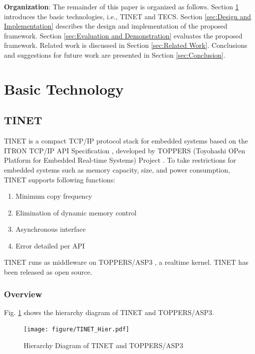 \documentclass[conference]{IEEEtran/IEEEtran}
\begin{document}
{\bf Organization}: The remainder of this paper is organized as follows.
Section \ref{sec:Basic Technology} introduces the basic technologies, i.e., TINET and TECS.
Section \ref{sec:Design and Implementation} describes the design and implementation of the proposed framework.
Section \ref{sec:Evaluation and Demonstration} evaluates the proposed framework.
Related work is discussed in Section \ref{sec:Related Work}.
Conclusions and suggestions for future work are presented in Section \ref{sec:Conclusion}.


\section{Basic Technology}
\label{sec:Basic Technology}

\subsection{TINET}

TINET is a compact TCP/IP protocol stack for embedded systems based on the ITRON TCP/IP API Specification \cite{url:ITRON_TCP/IP_API_Spec}, developed by TOPPERS (Toyohashi OPen Platform for Embedded Real-time Systems) Project \cite{url:TOPPERS}.
To take restrictions for embedded systems such as memory capacity, size, and power consumption, TINET supports following functions:

\begin{enumerate}
    \item Minimum copy frequency
    \item Elimination of dynamic memory control
    \item Asynchronous interface
    \item Error detailed per API
\end{enumerate}


TINET runs as middleware on TOPPERS/ASP3 \cite{url:ASP3}, a realtime kernel.
TINET has been released as open source.

\subsubsection{Overview}

Fig. \ref{fig:TINET_Hier} shows the hierarchy diagram of TINET and TOPPERS/ASP3.

\begin{figure}[t]
    \centering
    \texttt{[image: figure/TINET\_Hier.pdf]}
    \caption{Hierarchy Diagram of TINET and TOPPERS/ASP3}
    \label{fig:TINET_Hier}
\end{figure}
\end{document}
